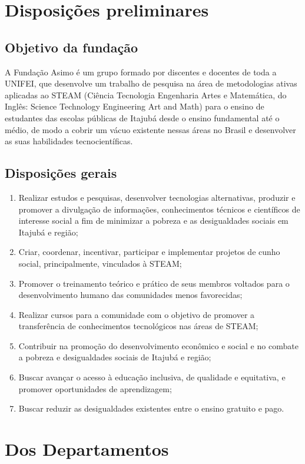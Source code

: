 \section{Disposições preliminares}

    \subsection{Objetivo da fundação}
    A Fundação Asimo é um grupo formado por discentes e docentes de toda a UNIFEI, que desenvolve um trabalho de pesquisa na área de metodologias ativas aplicadas ao STEAM (Ciência Tecnologia Engenharia Artes e Matemática, do Inglês: Science Technology Engineering Art and Math) para o ensino de estudantes das escolas públicas de Itajubá desde o ensino fundamental até o médio, de modo a cobrir um vácuo existente nessas áreas no Brasil e desenvolver as suas habilidades tecnocientíficas.
    \subsection{Disposições gerais}
    \begin{enumerate}
        \item Realizar estudos e pesquisas, desenvolver tecnologias alternativas, produzir e promover a divulgação de informações, conhecimentos técnicos e científicos de interesse social a fim de minimizar a pobreza e as desigualdades sociais em Itajubá e região;
        \item Criar, coordenar, incentivar, participar e implementar projetos de cunho social, principalmente, vinculados à STEAM;
        \item Promover o treinamento teórico e prático de seus membros voltados para o desenvolvimento humano das comunidades menos favorecidas;
        \item Realizar cursos para a comunidade com o objetivo de promover a transferência de conhecimentos tecnológicos nas áreas de STEAM;
        \item Contribuir na promoção do desenvolvimento econômico e social e no combate a pobreza e desigualdades sociais de Itajubá e região;
        \item Buscar avançar o acesso à educação inclusiva, de qualidade e equitativa, e promover oportunidades de aprendizagem;
        \item Buscar reduzir as desigualdades existentes entre o ensino gratuito e pago.
    \end{enumerate}
\section{Dos Departamentos}

